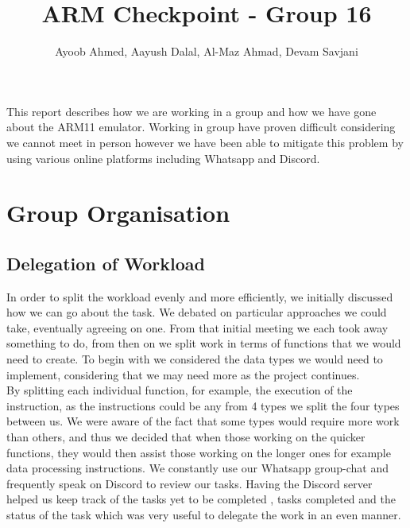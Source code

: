 \documentclass[10pt]{article}
\begin{document}
\title{\vspace{-2cm}ARM Checkpoint - Group 16}
\author{\small Ayoob Ahmed, Aayush Dalal, Al-Maz Ahmad, Devam Savjani}


\maketitle

This report describes how we are working in a group and how we have gone about the ARM11 emulator. Working in group have proven difficult considering we cannot meet in person however we have been able to mitigate this problem by using various online platforms including Whatsapp and Discord.
\section{Group Organisation}
\subsection{Delegation of Workload}
In order to split the workload evenly and more efficiently, we initially discussed how we can go about the task. We debated on particular approaches we could take, eventually agreeing on one. From that initial meeting we each took away something to do, from then on we split work in terms of functions that we would need to create. To begin with we considered the data types we would need to implement, considering that we may need more as the project continues. 
\\By splitting each individual function, for example, the execution of the instruction, as the instructions could be any from 4 types we split the four types between us. We were aware of the fact that some types would require more work than others, and thus we decided that when those working on the quicker functions, they would then assist those working on the longer ones for example data processing instructions. We constantly use our Whatsapp group-chat and frequently speak on Discord to review our tasks. Having the Discord server helped us keep track of the tasks yet to be completed , tasks completed and the status of the task which was very useful to delegate the work in an even manner.
\end{document}
